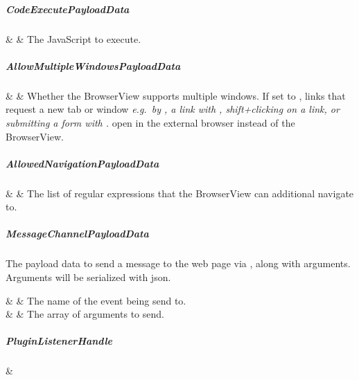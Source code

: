 \subparagraph{CodeExecutePayloadData}

\begin{interfacedesc}
   &  & The JavaScript to execute. \\ \hline
\end{interfacedesc}

\subparagraph{AllowMultipleWindowsPayloadData}

\begin{interfacedesc}
   &  & Whether the BrowserView supports multiple windows. If set to , links that request a new tab or window \textit{e.g.\ by , a link with , shift+clicking on a link, or submitting a form with .} open in the external browser instead of the BrowserView. \\ \hline
\end{interfacedesc}

\subparagraph{AllowedNavigationPayloadData}

\begin{interfacedesc}
   &  & The list of regular expressions that the BrowserView can additional navigate to. \\ \hline
\end{interfacedesc}

\subparagraph{MessageChannelPayloadData}

The payload data to send a message to the web page via ,
along with arguments. Arguments will be serialized with \ac{json}.

\begin{interfacedesc}
   &  & The name of the event being send to. \\ \hline
        &   & The array of arguments to send. \\ \hline
\end{interfacedesc}

\subparagraph{PluginListenerHandle}

\begin{interface}
   &  \\ \hline
\end{interface}

